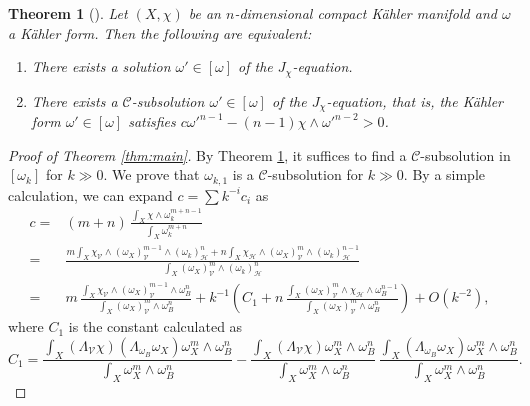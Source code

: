 \documentclass{amsart}
\numberwithin{equation}{section}
\theoremstyle{plain}
\newtheorem{theorem}[equation]{Theorem}
\theoremstyle{definition}
\theoremstyle{remark}
\begin{document}
\begin{theorem}[{\cite{SW}}]\label{thm:SW}
    Let $(X,\chi)$ be an $n$-dimensional compact K{\"a}hler manifold and $\omega$ a K{\"a}hler form. Then the following are equivalent:
    \begin{enumerate}[font=\normalfont]
        \item There exists a solution $\omega'\in[\omega]$ of the $J_\chi$-equation.
        \item There exists a $\mathcal{C}$-subsolution $\omega'\in[\omega]$ of the $J_\chi$-equation, that is, the K{\"a}hler form $\omega'\in[\omega]$ satisfies $c\omega'^{n-1}-(n-1)\chi\wedge\omega'^{n-2}>0$.
    \end{enumerate}
\end{theorem}

\begin{proof}[Proof of Theorem \ref{thm:main}]
    By Theorem \ref{thm:SW}, it suffices to find a $\mathcal{C}$-subsolution in $[\omega_k]$ for $k\gg0$. We prove that $\omega_{k,1}$ is a $\mathcal{C}$-subsolution for $k\gg 0$.
    By a simple calculation, we can expand $c=\sum k^{-i}c_i$ as 
    \begin{equation}\label{eq:cexpan}
    \begin{split}
    c=&(m+n) \, \frac{\int_X \chi \wedge \omega_k^{m+n-1}}{\int_X \omega_k^{m+n}}\\
    =& \frac{m \int_X \chi_\mathcal{V} \wedge \left(\omega_X \right)_\mathcal{V}^{m-1} \wedge \left(\omega_k\right)_\mathcal{H}^n 
    +n \int_X \chi_\mathcal{H} \wedge \left(\omega_X\right)_\mathcal{V}^m \wedge \left( \omega_k\right)_\mathcal{H}^{n-1}}
    {\int_X \left(\omega_X\right)_\mathcal{V}^m \wedge \left( \omega_k\right)_\mathcal{H}^n}\\
    =& m \, \frac{\int_X \chi_\mathcal{V} \wedge \left(\omega_X\right)_\mathcal{V}^{m-1} \wedge \omega_B^n}{\int_X \left(\omega_X\right)_\mathcal{V}^m \wedge \omega_B^n} + k^{-1}\left(C_1 +n \, \frac{\int_X \left(\omega_X\right)_\mathcal{V}^m \wedge \chi_\mathcal{H} \wedge \omega_B^{n-1}}{\int_X \left(\omega_X\right)_\mathcal{V}^m \wedge \omega_B^n}\right) +O\left(k^{-2}\right),
    \end{split}
    \end{equation}
    where $C_1$ is the constant calculated as
    \begin{equation*}
    C_1 = \frac{\int_X \left(\Lambda_\mathcal{V} \chi\right) \left(\Lambda_{\omega_B} \omega_X\right) \omega_X^m \wedge \omega_B^n}{\int_X \omega_X^m \wedge \omega_B^n}-
    \frac{\int_X \left(\Lambda_\mathcal{V} \chi\right) \omega_X^m \wedge \omega_B^n}{\int_X \omega_X^m \wedge \omega_B^n}\, \frac{\int_X \left(\Lambda_{\omega_B} \omega_X\right) \omega_X^m \wedge \omega_B^n}{\int_X \omega_X^m \wedge \omega_B^n}.

\end{equation*}
\end{proof}
\end{document}
